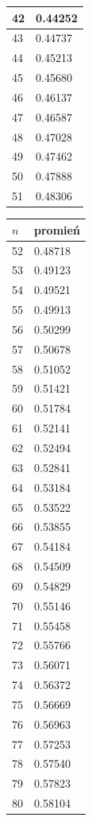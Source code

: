 \documentclass{article}
\begin{document}
\begin{table}[H]
\begin{tabular}{|l|l|}
42 & 0.44252 \\ \hline
43 & 0.44737 \\ \hline
44 & 0.45213 \\ \hline
45 & 0.45680 \\ \hline
46 & 0.46137 \\ \hline
47 & 0.46587 \\ \hline
48 & 0.47028 \\ \hline
49 & 0.47462 \\ \hline
50 & 0.47888 \\ \hline
51 & 0.48306 \\ \hline
\end{tabular}
\begin{tabular}{|l|l|}
\hline
$n$ & promień \\ \hline
52 & 0.48718 \\ \hline
53 & 0.49123 \\ \hline
54 & 0.49521 \\ \hline
55 & 0.49913 \\ \hline
56 & 0.50299 \\ \hline
57 & 0.50678 \\ \hline
58 & 0.51052 \\ \hline
59 & 0.51421 \\ \hline
60 & 0.51784 \\ \hline
61 & 0.52141 \\ \hline
62 & 0.52494 \\ \hline
63 & 0.52841 \\ \hline
64 & 0.53184 \\ \hline
65 & 0.53522 \\ \hline
66 & 0.53855 \\ \hline
67 & 0.54184 \\ \hline
68 & 0.54509 \\ \hline
69 & 0.54829 \\ \hline
70 & 0.55146 \\ \hline
71 & 0.55458 \\ \hline
72 & 0.55766 \\ \hline
73 & 0.56071 \\ \hline
74 & 0.56372 \\ \hline
75 & 0.56669 \\ \hline
76 & 0.56963 \\ \hline
77 & 0.57253 \\ \hline
78 & 0.57540 \\ \hline
79 & 0.57823 \\ \hline
80 & 0.58104 \\ \hline

\end{tabular}
\end{table}
\end{document}

